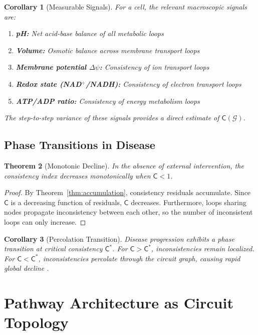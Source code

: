 \documentclass[10pt,twocolumn,a4paper]{article}
\theoremstyle{plain}
\newtheorem{theorem}{Theorem}[section]
\newtheorem{corollary}[theorem]{Corollary}
\theoremstyle{definition}
\theoremstyle{remark}
\newcommand{\circuit}{\mathcal{G}}
\newcommand{\consist}{\mathsf{C}}
\begin{document}
\begin{corollary}[Measurable Signals]
\label{cor:measurable}
For a cell, the relevant macroscopic signals are:
\begin{enumerate}[label=(\roman*)]
    \item \textbf{pH:} Net acid-base balance of all metabolic loops
    \item \textbf{Volume:} Osmotic balance across membrane transport loops
    \item \textbf{Membrane potential $\Delta\psi$:} Consistency of ion transport loops
    \item \textbf{Redox state (NAD$^+$/NADH):} Consistency of electron transport loops
    \item \textbf{ATP/ADP ratio:} Consistency of energy metabolism loops
\end{enumerate}
The step-to-step variance of these signals provides a direct estimate of $\consist(\circuit)$.
\end{corollary}

\subsection{Phase Transitions in Disease}

\begin{theorem}[Monotonic Decline]
\label{thm:monotonic}
In the absence of external intervention, the consistency index decreases monotonically when $\consist < 1$.
\end{theorem}

\begin{proof}
By Theorem~\ref{thm:accumulation}, consistency residuals accumulate. Since $\consist$ is a decreasing function of residuals, $\consist$ decreases. Furthermore, loops sharing nodes propagate inconsistency between each other, so the number of inconsistent loops can only increase.
\end{proof}

\begin{corollary}[Percolation Transition]
\label{cor:percolation}
Disease progression exhibits a phase transition at critical consistency $\consist^*$. For $\consist > \consist^*$, inconsistencies remain localized. For $\consist < \consist^*$, inconsistencies percolate through the circuit graph, causing rapid global decline \citep{stauffer1994}.
\end{corollary}


\section{Pathway Architecture as Circuit Topology}
\label{sec:pathways}
\end{document}
